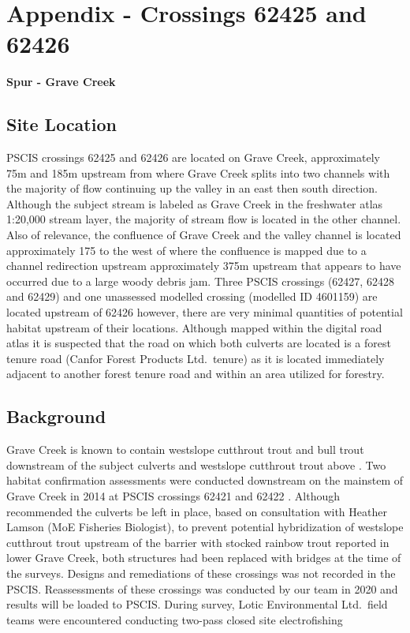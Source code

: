 \documentclass[
]{book}
\begin{document}
\hypertarget{appendix---crossings-62425-and-62426}{%
\chapter*{Appendix - Crossings 62425 and 62426}\label{appendix---crossings-62425-and-62426}}

\textbf{Spur - Grave Creek}

\hypertarget{site-location-4}{%
\section*{Site Location}\label{site-location-4}}

PSCIS crossings 62425 and 62426 are located on Grave Creek, approximately 75m and 185m upstream from where Grave Creek splits into two channels with the majority of flow continuing up the valley in an east then south direction. Although the subject stream is labeled as Grave Creek in the freshwater atlas 1:20,000 stream layer, the majority of stream flow is located in the other channel. Also of relevance, the confluence of Grave Creek and the valley channel is located approximately 175 to the west of where the confluence is mapped due to a channel redirection upstream approximately 375m upstream that appears to have occurred due to a large woody debris jam. Three PSCIS crossings (62427, 62428 and 62429) and one unassessed modelled crossing (modelled ID 4601159) are located upstream of 62426 however, there are very minimal quantities of potential habitat upstream of their locations. Although mapped within the digital road atlas it is suspected that the road on which both culverts are located is a forest tenure road (Canfor Forest Products Ltd.~tenure) as it is located immediately adjacent to another forest tenure road and within an area utilized for forestry.

\hypertarget{background-5}{%
\section*{Background}\label{background-5}}

Grave Creek is known to contain westslope cutthrout trout and bull trout downstream of the subject culverts and westslope cutthrout trout above \citep{data_fish_obs}. Two habitat confirmation assessments were conducted downstream on the mainstem of Grave Creek in 2014 at PSCIS crossings 62421 and 62422 \citep{masseEKConfirmation2015}. Although \citet{masseEKConfirmation2015} recommended the culverts be left in place, based on consultation with Heather Lamson (MoE Fisheries Biologist), to prevent potential hybridization of westslope cutthrout trout upstream of the barrier with stocked rainbow trout reported in lower Grave Creek, both structures had been replaced with bridges at the time of the surveys. Designs and remediations of these crossings was not recorded in the PSCIS. Reassessments of these crossings was conducted by our team in 2020 and results will be loaded to PSCIS. During survey, Lotic Environmental Ltd.~field teams were encountered conducting two-pass closed site electrofishing
\end{document}
